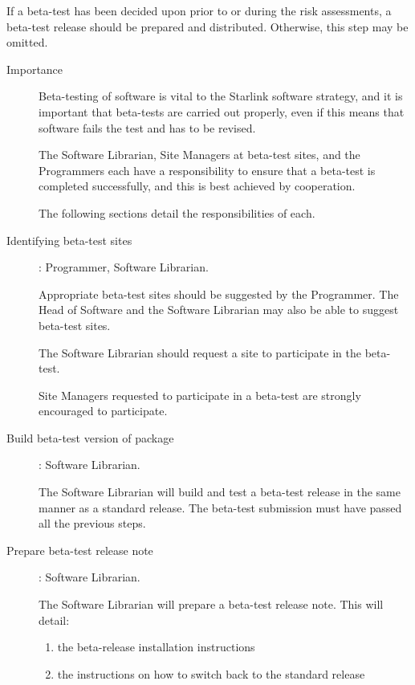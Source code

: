 If a beta-test has been decided upon prior to or during the risk
assessments, a beta-test release should be prepared and distributed.
Otherwise, this step may be omitted.

\begin{description}

\item[Importance]\mbox{}

Beta-testing of software is vital to the Starlink software strategy,
and it is important that beta-tests are carried out properly, even
if this means that software fails the test and has to be revised.

The Software Librarian, Site Managers at beta-test sites, and the
Programmers each have a responsibility to ensure that a beta-test is
completed successfully, and this is best achieved by cooperation.

The following sections detail the responsibilities of each.

\item[Identifying beta-test sites]: Programmer, Software Librarian.

Appropriate beta-test sites should be suggested by the Programmer.  The
Head of Software and the Software Librarian may also be able to suggest
beta-test sites.

The Software Librarian should request a site to participate in
the beta-test.

Site Managers requested to participate in a beta-test are strongly
encouraged to participate.

\item[Build beta-test version of package]: Software Librarian.

The Software Librarian will build and test a beta-test release in the
same manner as a standard release.  The beta-test submission must have
passed all the previous steps.

\item[Prepare beta-test release note]: Software Librarian.

The Software Librarian will prepare a beta-test release note.  This
will detail:

\begin{enumerate}

\item the beta-release installation instructions

\item the instructions on how to switch back to the standard release


\end{enumerate}
\end{description}
